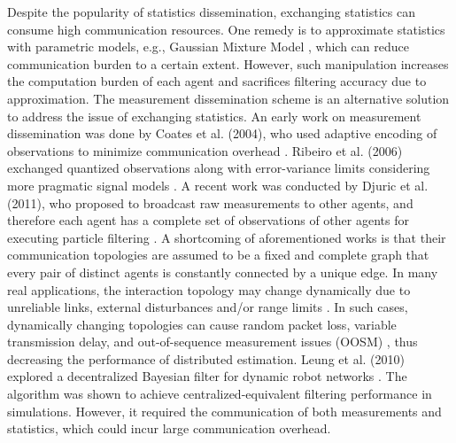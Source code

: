 	
	Despite the popularity of statistics dissemination, exchanging statistics can consume high communication resources. 
	One remedy is to approximate statistics with parametric models, e.g., Gaussian Mixture Model \cite{sheng2005distributed}, which can reduce communication burden to a certain extent. 
	However, such manipulation increases the computation burden of each agent and sacrifices filtering  accuracy due to approximation.
	The measurement dissemination scheme is an alternative solution to address the issue of exchanging statistics. 
	An early work on measurement dissemination was done by Coates et al. (2004), who used adaptive encoding of observations to minimize communication overhead \cite{coates2004distributed}. Ribeiro et al. (2006) exchanged quantized observations along with error-variance limits considering more pragmatic signal models \cite{ribeiro2006bandwidth}.
	A recent work was conducted by Djuric et al. (2011), who proposed to broadcast raw measurements to other agents, and therefore each agent has a complete set of observations of other agents for executing particle filtering \cite{djuric2011non}.  
	A shortcoming of aforementioned works is that their communication topologies are assumed to be a fixed and complete graph that every pair of distinct agents is constantly connected by a unique edge. 
	In many real applications, the interaction topology may change dynamically due to unreliable links, external disturbances and/or range limits \cite{xiao2008asynchronous}.
	In such cases, dynamically changing topologies can cause random packet loss, variable transmission delay, and out-of-sequence measurement issues (OOSM) \cite{xia2009networked}, thus decreasing the performance of distributed estimation.
	Leung et al. (2010) explored a decentralized Bayesian filter for dynamic robot networks \cite{leung2010decentralized}.
	The algorithm was shown to achieve centralized-equivalent filtering performance in simulations. 
	However, it required the communication of both measurements and statistics, which could incur large communication overhead.
		
